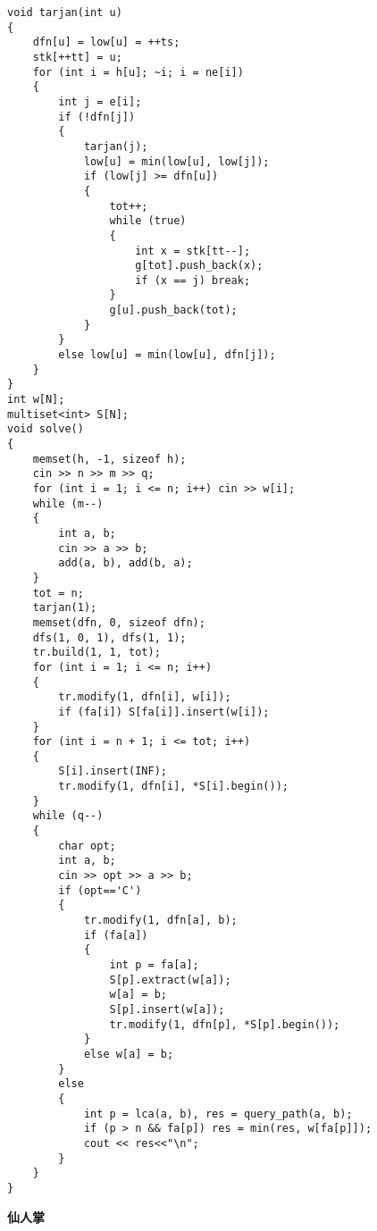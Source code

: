 \documentclass[a4paper,fontset=none]{ctexart}
\begin{document}
\begin{verbatim}
void tarjan(int u)
{
    dfn[u] = low[u] = ++ts;
    stk[++tt] = u;
    for (int i = h[u]; ~i; i = ne[i])
    {
        int j = e[i];
        if (!dfn[j])
        {
            tarjan(j);
            low[u] = min(low[u], low[j]);
            if (low[j] >= dfn[u])
            {
                tot++;
                while (true)
                {
                    int x = stk[tt--];
                    g[tot].push_back(x);
                    if (x == j) break;
                }
                g[u].push_back(tot);
            }
        }
        else low[u] = min(low[u], dfn[j]);
    }
}
int w[N];
multiset<int> S[N];
void solve()
{
    memset(h, -1, sizeof h);
    cin >> n >> m >> q;
    for (int i = 1; i <= n; i++) cin >> w[i];
    while (m--)
    {
        int a, b;
        cin >> a >> b;
        add(a, b), add(b, a);
    }
    tot = n;
    tarjan(1);
    memset(dfn, 0, sizeof dfn);
    dfs(1, 0, 1), dfs(1, 1);
    tr.build(1, 1, tot);
    for (int i = 1; i <= n; i++)
    {
        tr.modify(1, dfn[i], w[i]);
        if (fa[i]) S[fa[i]].insert(w[i]);
    }
    for (int i = n + 1; i <= tot; i++)
    {
        S[i].insert(INF);
        tr.modify(1, dfn[i], *S[i].begin());
    }
    while (q--)
    {
        char opt;
        int a, b;
        cin >> opt >> a >> b;
        if (opt=='C')
        {
            tr.modify(1, dfn[a], b);
            if (fa[a])
            {
                int p = fa[a];
                S[p].extract(w[a]);
                w[a] = b;
                S[p].insert(w[a]);
                tr.modify(1, dfn[p], *S[p].begin());
            }
            else w[a] = b;
        }
        else
        {
            int p = lca(a, b), res = query_path(a, b);
            if (p > n && fa[p]) res = min(res, w[fa[p]]);
            cout << res<<"\n";
        }
    }
}
\end{verbatim}

\textbf{仙人掌}
\end{document}
